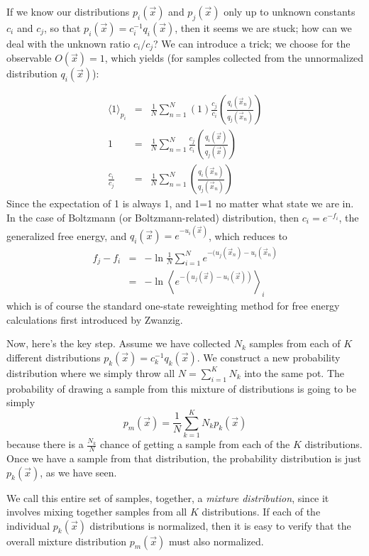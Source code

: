 \documentclass[aps,pre,twocolumn,superscriptaddress]{revtex4-1}
\newcommand{\expect}[1]{\left \langle #1 \right \rangle} %
\begin{document}
If we know our distributions $p_i(\vec{x})$ and $p_j(\vec{x})$ only up
to unknown constants $c_i$ and $c_j$, so that $p_i(\vec{x}) =
c_i^{-1}q_i(\vec{x})$, then it seems we are stuck; how can we deal
with the unknown ratio $c_i/c_j$? We can introduce a trick; we choose
for the observable $O(\vec{x})=1$, which yields (for samples collected
from the unnormalized distribution $q_i(\vec{x})$):

\begin{eqnarray}
\langle 1 \rangle_{p_i} &=& \frac{1}{N} \sum_{n=1}^{N} \left(1\right) \frac{c_j}{c_i} \left(\frac{q_i(\vec{x}_n)}{q_j(\vec{x}_n)}\right) \nonumber \\
        1  &=& \frac{1}{N} \sum_{n=1}^{N}\frac{c_j}{c_i} \left(\frac{q_i(\vec{x})}{q_j(\vec{x})}\right) \nonumber \\
       \frac{c_i}{c_j}  &=& \frac{1}{N} \sum_{n=1}^{N} \left(\frac{q_i(\vec{x}_n)}{q_j(\vec{x}_n)}\right)
\end{eqnarray}
Since the expectation of 1 is always 1, and 1=1 no matter what state
we are in. In the case of Boltzmann (or Boltzmann-related)
distribution, then $c_i = e^{-f_i}$, the generalized free energy, and
$q_i(\vec{x}) = e^{-u_i(\vec{x})}$, which reduces to
\begin{eqnarray}
f_j-f_i  &=& -\ln \frac{1}{N} \sum_{i=1}^N e^{-(u_j(\vec{x}_n)-u_i(\vec{x}_n)}  \nonumber \\
            &=& -\ln \expect{ e^{-(u_j(\vec{x})-u_i(\vec{x}))}}_{i}
\end{eqnarray}
which is of course the standard one-state reweighting method for free
energy calculations first introduced by Zwanzig.

Now, here's the key step.  Assume we have collected $N_k$ samples from
each of $K$ different distributions $p_k(\vec{x}) = c_k^{-1}
q_k(\vec{x})$. We construct a new probability distribution where we
simply throw all $N = \sum_{i=1}^K N_k$ into the same pot. The
probability of drawing a sample from this mixture of distributions is
going to be simply
\begin{equation}
p_m(\vec{x}) = \frac{1}{N}\sum_{k=1}^K N_k p_k(\vec{x})
\end{equation}
because there is a $\frac{N_k}{N}$ chance of getting a sample from
each of the $K$ distributions. Once we have a sample from that
distribution, the probability distribution is just $p_k(\vec{x})$, as
we have seen.

We call this entire set of samples, together, a {\em mixture
  distribution}, since it involves mixing together samples from all
$K$ distributions.  If each of the individual $p_k(\vec{x})$
distributions is normalized, then it is easy to verify that the
overall mixture distribution $p_m(\vec{x})$ must also normalized.
\end{document}
